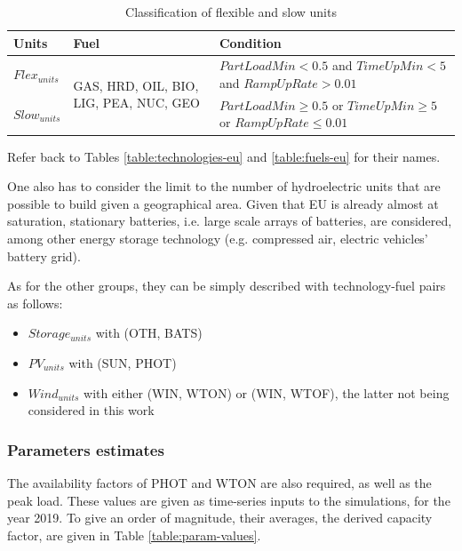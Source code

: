 \begin{table}[h!]
    \centering
	\begin{tabular}{|l | l | p{8cm}|}
		\hline
		Units & Fuel & Condition \\
		\hline
		$Flex_{units}$ & \multirow{2}{3cm}{GAS, HRD, OIL, BIO, LIG, PEA, NUC, GEO} & $PartLoadMin<0.5$ and $TimeUpMin<5$ and $RampUpRate>0.01$\\ \cline{1-1} \cline{3-3}
		$Slow_{units}$ &  & $PartLoadMin\geq 0.5$ or $TimeUpMin \geq 5$ or $RampUpRate\leq 0.01$\\
		\hline
	\end{tabular}
	\caption{Classification of flexible and slow units}
	\label{table:flex-vs-slow-unit}
\end{table}

Refer back to Tables \ref{table:technologies-eu} and \ref{table:fuels-eu} for their names.

One also has to consider the limit to the number of hydroelectric units that are possible to build given a geographical area. Given that EU is already almost at saturation, stationary batteries, i.e. large scale arrays of batteries, are considered, among other energy storage technology (e.g. compressed air, electric vehicles' battery grid).

As for the other groups, they can be simply described with technology-fuel pairs as follows:
\begin{itemize}
    \item $Storage_{units}$ with (OTH, BATS)
    \item $PV_{units}$ with (SUN, PHOT)
    \item $Wind_{units}$ with either (WIN, WTON) or (WIN, WTOF), the latter not being considered in this work
\end{itemize}

\subsubsection{Parameters estimates}

The availability factors of PHOT and WTON are also required, as well as the peak load. These values are given as time-series inputs to the simulations, for the year 2019. To give an order of magnitude, their averages, the derived capacity factor, are given in Table \ref{table:param-values}.


